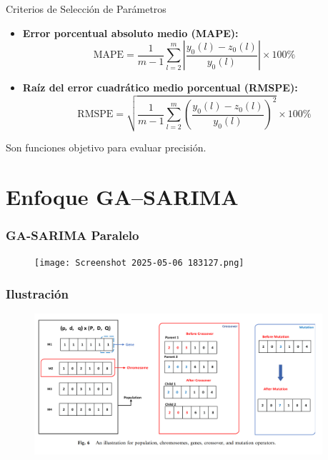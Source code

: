 \documentclass[aspectratio=1610]{beamer}
\begin{document}
\begin{frame}{Criterios de Selección de Parámetros}
\begin{itemize}
    \item \textbf{Error porcentual absoluto medio (MAPE):}
\begin{equation*}
\text{MAPE} = \frac{1}{m - 1} \sum_{l=2}^{m} \left| \frac{y_0(l) - z_0(l)}{y_0(l)} \right| \times 100\%
\end{equation*}

\item \textbf{Raíz del error cuadrático medio porcentual (RMSPE):}
\begin{equation*}
\text{RMSPE} = \sqrt{ \frac{1}{m - 1} \sum_{l=2}^{m} \left( \frac{y_0(l) - z_0(l)}{y_0(l)} \right)^2 } \times 100\%
\end{equation*}
\end{itemize}

Son funciones objetivo para evaluar precisión.
\end{frame}







\section{Enfoque GA–SARIMA}



\begin{frame}[fragile]
    \frametitle{GA-SARIMA Paralelo}
    \begin{figure}
        \centering
        \texttt{[image: Screenshot 2025-05-06 183127.png]}
    \end{figure}
\end{frame}








\begin{frame}[fragile]
    \frametitle{Ilustración}
    \begin{figure}
        \centering
        \includegraphics[width=0.95\textwidth]{Opti-Imagenes/02-04.png}
    \end{figure}
\end{frame}
\end{document}
